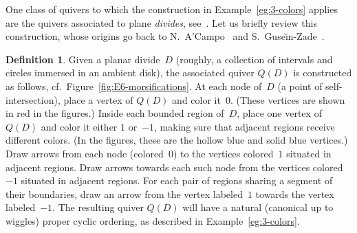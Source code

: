 \documentclass[11pt, letterpaper]{amsart}
\theoremstyle{definition}
\newtheorem{definition}[theorem]{Definition}
\numberwithin{equation}{section}
\begin{document}
One class of quivers to which the construction in Example~\ref{eg:3-colors} applies are 
the quivers associated to plane \emph{divides}, see~\cite{FPST}. 
Let us briefly review this construction, whose origins go back to N.~A'Campo~\cite{acampo} and S.~Guse\u\i n-Zade~\cite{gusein-zade-1}. 

\begin{definition}
\label{def:divide-quiver}
Given a planar divide~$D$ (roughly, a collection of intervals and circles immersed in an ambient disk), 
the associated quiver $Q(D)$ is constructed  as follows, cf.\ Figure~\ref{fig:E6-morsifications}. 
At each node of~$D$ (a point of self-intersection), place a vertex of $Q(D)$ and color it~$0$. 
(These vertices are shown in red in the figures.) 
Inside each bounded region of~$D$, place one vertex of $Q(D)$ and color it either $1$ or~$-1$,
making sure that adjacent regions receive different colors.
(In the figures, these are the hollow blue and solid blue vertices.) 
Draw arrows from each node (colored~0) to the vertices colored~$1$ situated in adjacent regions.
Draw arrows towards each such node from the vertices colored~$-1$ situated in adjacent regions.
For each pair of regions sharing a segment of their boundaries,
draw an arrow from the vertex labeled~$1$ towards the vertex labeled~$-1$. 
The resulting quiver $Q(D)$ will have a natural (canonical up to wiggles) 
proper cyclic ordering, as described in Example~\ref{eg:3-colors}. 
\end{definition}
\end{document}

